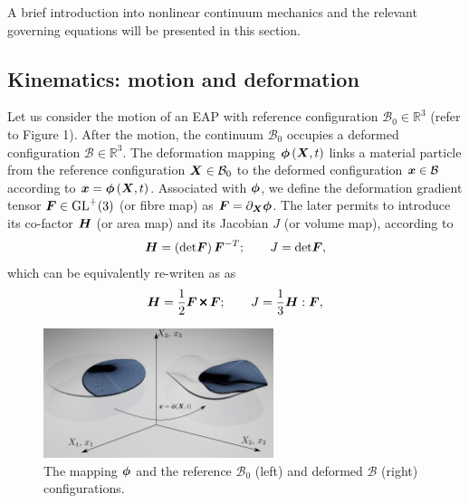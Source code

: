 A brief introduction into nonlinear continuum mechanics and the relevant governing equations will be presented in this section. 

\subsection{Kinematics: motion and deformation}\label{sec:kinematics}

Let us consider the motion of an EAP with reference configuration $\mathcal{B}_0\in \mathbb{R}^3$ (refer to Figure 1). 
After the motion, the continuum $\mathcal{B}_0$ occupies a deformed configuration $\mathcal{B}\in\mathbb{R}^3$. 
The deformation mapping $\boldsymbol{\phi}\left(\boldsymbol{X},t\right)$ links a material particle from the reference configuration $\boldsymbol{X}\in \mathcal{B}_0$ to the deformed configuration $\boldsymbol{x}\in \mathcal{B}$ according to $\boldsymbol{x} = \boldsymbol{\phi}\left(\boldsymbol{X},t\right)$. Associated with $\boldsymbol{\phi}$, we define the deformation gradient tensor $\boldsymbol{F}\in \text{GL}^{+}(3)$ (or fibre map) \cite{Bonet_book_statics,Gonzalez_book,deSouza_book,Bathe_book} as $\boldsymbol{F}=\partial_{\boldsymbol{X}}\boldsymbol{\phi}$. The later permits to introduce its co-factor  $\boldsymbol{H}$ (or area map) and its Jacobian $J$ (or volume map), according to 
%
\begin{equation}\label{eqn:H and J classical}
\boldsymbol{H} = \left(\text{det}\boldsymbol{F}\right)\boldsymbol{F}^{-T};\qquad
J = \text{det}\boldsymbol{F},
\end{equation}
%
which can be equivalently re-writen as \cite{deBoer_book,Bonet_cross_product_2016} as
%
\begin{equation}\label{eqn:H and J tensor cross product expression}
	\vect{H}=\frac{1}{2}\vect{F}\Cross\vect{F}; \qquad  J=\frac{1}{3}\vect{H}:\vect{F},
\end{equation}
%
%

\begin{figure}[htbp]
	\begin{center}
		\includegraphics[width=0.6\textwidth]{Figures/InkScape/TheMappingdeLaOstia}
	\end{center}
	\caption{The mapping $\boldsymbol{\phi}$ and the reference $\mathcal{B}_0$ (left) and deformed $\mathcal{B}$ (right) configurations.}
	\label{fig:superpotato}
\end{figure}

